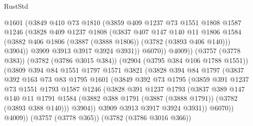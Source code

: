 \begin{lexlean}{RustStd}
\begin{coremodule}
                    @1601
                    (@3849
                      @410
                      @73
                      @1810
                      (@3859
                        @409
                        @1237
                        @73
                        @1551
                        @1808
                        @1587
                        @1246
                        (@3828
                          @409
                          @1237
                          @1808
                          (@3837
                            @407
                            @147
                            @140
                            @11
                            @1806
                            @1584
                            (@3882 @406 @1806 (@3887 (@3888 @1806)) (@3782 (@3893 @406 @140)))
                            @3904))
                        @3909
                        @3913
                        @3917
                        @3924
                        @3931))
                    @6070))
                @4009))
            (@3757 (@3778 @383))
            (@3782 (@3786 @3015 @384))
            (@2904 (@3795 @384 @106 @1788 @1551))
            (@3809
              @394
              @84
              @1551
              @1797
              @1571
              @3821
              (@3828
                @394
                @84
                @1797
                (@3837
                  @392
                  @163
                  @73
                  @83
                  @1795
                  @1601
                  (@3849
                    @392
                    @73
                    @1795
                    (@3859
                      @391
                      @1237
                      @73
                      @1551
                      @1793
                      @1587
                      @1246
                      (@3828
                        @391
                        @1237
                        @1793
                        (@3837
                          @389
                          @147
                          @140
                          @11
                          @1791
                          @1584
                          (@3882 @388 @1791 (@3887 (@3888 @1791)) (@3782 (@3893 @388 @140)))
                          @3904))
                      @3909
                      @3913
                      @3917
                      @3924
                      @3931))
                  @6070))
              @4009))
          (@3757 (@3778 @365))
          (@3782 (@3786 @3016 @366))

\end{coremodule}
\end{lexlean}
